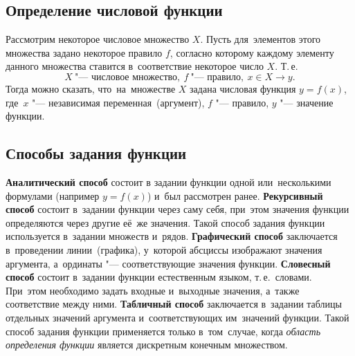 \documentclass[]{scrartcl}
\begin{document}
\subsection{Определение числовой функции}
Рассмотрим некоторое числовое множество ${\textstyle X}$. Пусть для~элементов этого множества задано некоторое правило ${\textstyle f}$, согласно которому каждому элементу данного множества ставится в~соответствие некоторое число ${\textstyle X}$. Т.\,е.
\begin{equation}\label{eq:function-def-1}
X\ \text{"--- числовое множество},\ f\ \text{"--- правило},\ x \in X \rightarrow y.
\end{equation}
Тогда можно сказать, что~на~множестве ${\textstyle X}$ задана числовая функция ${\textstyle y=f(x)}$, где~${\textstyle x}$ "--- независимая переменная~(аргумент), ${\textstyle f}$ "--- правило, ${\textstyle y}$ "--- значение функции.

\subsection{Способы задания функции}
\textbf{Аналитический способ} состоит в задании функции одной или~несколькими формулами (например ${\textstyle y=f(x)}$) и~был рассмотрен ранее.
\textbf{Рекурсивный способ} состоит в~задании функции через саму себя, при~этом значения функции определяются через другие её~же значения. Такой способ задания функции используется в~задании множеств и~рядов.
\textbf{Графический способ} заключается в~проведении линии~(графика), у~которой абсциссы изображают значения аргумента, а~ординаты "--- соответствующие значения функции.
\textbf{Словесный способ} состоит в~задании функции естественным языком, т.\,е.~словами. При~этом необходимо задать входные и~выходные значения, а~также соответствие между ними.
\textbf{Табличный способ} заключается в~задании таблицы отдельных значений аргумента и~соответствующих им~значений функции. Такой способ задания функции применяется только в~том~случае, когда \emph{область определения функции} является дискретным конечным множеством.
\end{document}
